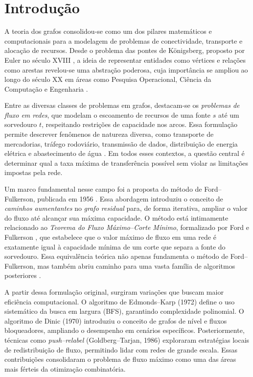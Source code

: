 \documentclass[12pt]{article}
\begin{document}
\newpage
\section{Introdução}

A teoria dos grafos consolidou-se como um dos pilares matemáticos e computacionais para a modelagem de problemas de conectividade, transporte e alocação de recursos. Desde o problema das pontes de Königsberg, proposto por Euler no século XVIII \cite{euler1736}, a ideia de representar entidades como vértices e relações como arestas revelou-se uma abstração poderosa, cuja importância se ampliou ao longo do século XX em áreas como Pesquisa Operacional, Ciência da Computação e Engenharia \cite{bondy1976,west2001}.

\noindent Entre as diversas classes de problemas em grafos, destacam-se os \emph{problemas de fluxo em redes}, que modelam o escoamento de recursos de uma fonte $s$ até um sorvedouro $t$, respeitando restrições de capacidade nos arcos. Essa formulação permite descrever fenômenos de natureza diversa, como transporte de mercadorias, tráfego rodoviário, transmissão de dados, distribuição de energia elétrica e abastecimento de água \cite{ahuja1993,ahuja1990}. Em todos esses contextos, a questão central é determinar qual a taxa máxima de transferência possível sem violar as limitações impostas pela rede.

\noindent Um marco fundamental nesse campo foi a proposta do método de Ford–Fulkerson, publicada em 1956 \cite{ford1956}. Essa abordagem introduziu o conceito de \emph{caminhos aumentantes} no \emph{grafo residual} para, de forma iterativa, ampliar o valor do fluxo até alcançar sua máxima capacidade. O método está intimamente relacionado ao \emph{Teorema do Fluxo Máximo–Corte Mínimo}, formalizado por Ford e Fulkerson \cite{ford1956}, que estabelece que o valor máximo de fluxo em uma rede é exatamente igual à capacidade mínima de um corte que separa a fonte do sorvedouro. Essa equivalência teórica não apenas fundamenta o método de Ford–Fulkerson, mas também abriu caminho para uma vasta família de algoritmos posteriores \cite{cormen2009}.

\noindent A partir dessa formulação original, surgiram variações que buscam maior eficiência computacional. O algoritmo de Edmonds–Karp (1972) \cite{edmonds1972} define o uso sistemático da busca em largura (BFS), garantindo complexidade polinomial. O algoritmo de Dinic (1970) \cite{dinic1970} introduziu o conceito de grafos de nível e fluxos bloqueadores, ampliando o desempenho em cenários específicos. Posteriormente, técnicas como \emph{push–relabel} (Goldberg–Tarjan, 1986) \cite{goldberg1988} exploraram estratégias locais de redistribuição de fluxo, permitindo lidar com redes de grande escala. Essas contribuições consolidaram o problema de fluxo máximo como uma das áreas mais férteis da otimização combinatória.
\end{document}
